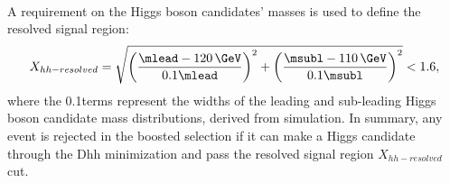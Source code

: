 \paragraph{}
A requirement on the Higgs boson candidates' masses is used to define the resolved signal region:
\begin{equation}
X_{hh-resolved} = \sqrt{\left(\frac{\mlead - 120\,\GeV}{0.1\mlead}\right)^2 + \left(\frac{\msubl - 110\,\GeV}{0.1\msubl}\right)^2} < 1.6,
\label{eqn:resolvedXhh}
\end{equation}
where the 0.1\mtwoj terms represent the widths of the leading and sub-leading Higgs boson candidate mass distributions, derived from simulation.
In summary, any event is rejected in the boosted selection if it can make a Higgs candidate through the Dhh minimization and pass the resolved signal region $X_{hh-resolved}$ cut.



